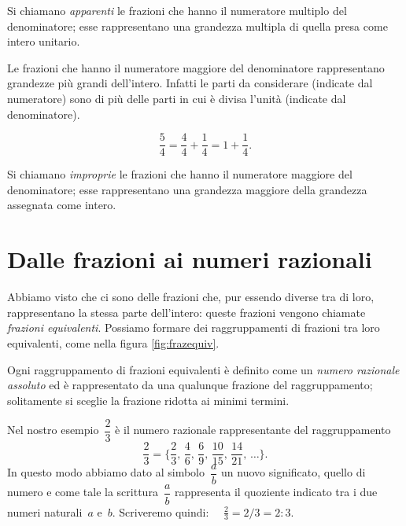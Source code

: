 \begin{definizione}
 Si chiamano \emph{apparenti} le frazioni che hanno il numeratore multiplo del denominatore;
esse rappresentano una grandezza multipla di quella presa come intero unitario.
\end{definizione}

Le frazioni che hanno il numeratore maggiore del denominatore rappresentano grandezze più grandi dell'intero.
Infatti le parti da considerare (indicate dal numeratore) sono di più delle parti in cui è divisa l'unità
(indicate dal denominatore).
\begin{center}
 
\end{center}
\[\frac{5}{4}=\frac{4}{4}+\frac{1}{4}=1+\frac{1}{4}.\]

\begin{definizione}
 Si chiamano \emph{improprie} le frazioni che hanno il numeratore maggiore del denominatore;
esse rappresentano una grandezza maggiore della grandezza assegnata come intero.
\end{definizione}

\ovalbox{\risolvii \ref{ese:3.5}, \ref{ese:3.6}, \ref{ese:3.7}, \ref{ese:3.8}, \ref{ese:3.9}, \ref{ese:3.10}, \ref{ese:3.11},
\ref{ese:3.12}, \ref{ese:3.13}, \ref{ese:3.14}, \ref{ese:3.15}, \ref{ese:3.16}, \ref{ese:3.17},}

\vspazio\ovalbox{\ref{ese:3.18}, \ref{ese:3.19}, \ref{ese:3.20}, \ref{ese:3.21}}

\section{Dalle frazioni ai numeri razionali}

Abbiamo visto che ci sono delle frazioni che, pur essendo diverse tra di loro, rappresentano la stessa
parte dell'intero: queste frazioni vengono chiamate \emph{frazioni equivalenti}.
Possiamo formare dei raggruppamenti di frazioni tra loro equivalenti, come nella figura \ref{fig:frazequiv}.

\begin{definizione}
Ogni raggruppamento di frazioni equivalenti è definito come un \emph{numero razionale assoluto}
ed è rappresentato da una qualunque
frazione del raggruppamento; solitamente si sceglie la frazione ridotta ai minimi termini.
\end{definizione}

Nel nostro esempio~$\dfrac{2}{3}$ è il numero razionale rappresentante del raggruppamento
\[\frac{2}{3}=\bigg\lbrace\frac{2}{3}\text{,~}\frac{4}{6}\text{,~}\frac{6}{9}\text{,~}\frac{10}{15}\text{,~}\frac{14}{21}\text{,~}\ldots\bigg\rbrace.\]
In questo modo abbiamo dato al simbolo~$\dfrac{a}{b}$ un nuovo significato, quello di numero e come tale la
scrittura~$\dfrac{a}{b}$ rappresenta il quoziente indicato tra i due numeri naturali~$a$ e~$b$. Scriveremo quindi:~~
$ \frac{2}{3} = 2/3 = 2:3 $.

